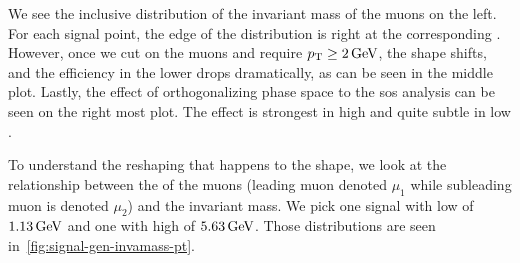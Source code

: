 We see the inclusive distribution of the invariant mass of the muons \mmumu on the left. For each signal point, the edge of the \mmumu distribution is right at the corresponding \dm. However, once we cut on the muons \pt and require $p_{\mathrm{T}}\geq 2\,\text{Ge\hspace{-.08em}V}$, the shape shifts, and the efficiency in the lower \dm drops dramatically, as can be seen in the middle plot. Lastly, the effect of orthogonalizing phase space to the \gls{sos} analysis can be seen on the right most plot. The effect is strongest in high \dm and quite subtle in low \dm. 

To understand the reshaping that happens to the \mmumu shape, we look at the relationship between the \pt of the muons (leading muon denoted $\mu_1$ while subleading muon is denoted $\mu_2$) and the invariant mass. We pick one signal with low \dm of $1.13\,\text{Ge\hspace{-.08em}V}$ and one with high \dm of $5.63\,\text{Ge\hspace{-.08em}V}$. Those distributions are seen in~\ref{fig:signal-gen-invamass-pt}.

